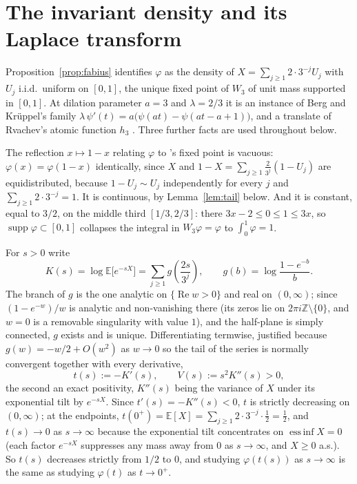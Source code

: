 \documentclass[11pt]{article}
\theoremstyle{definition}
\theoremstyle{remark}
\newcommand{\Z}{\mathbb{Z}}
\begin{document}
\section{The invariant density and its Laplace transform}
\label{sec:prelim}

Proposition~\ref{prop:fabius} identifies $\varphi$ as the density of
$X=\sum_{j\ge1}2\cdot3^{-j}U_j$ with $U_j$ i.i.d.\ uniform on $[0,1]$,
the unique fixed point of $W_3$ of unit mass supported in $[0,1]$. At
dilation parameter $a=3$ and $\lambda=2/3$ it is an instance of Berg
and Kr\"uppel's family $\lambda\,\psi'(t)=a\bigl(\psi(at)-\psi(at-a+1)\bigr)$,
and a translate of Rvachev's atomic function $h_3$ \cite{Rvachev1990}.
Three further facts are used throughout below.

The reflection $x\mapsto1-x$ relating $\varphi$ to
\cite[Cor.~7]{Wirsching2003}'s fixed point is vacuous:
$\varphi(x)=\varphi(1-x)$ identically, since $X$ and
$1-X=\sum_{j\ge1}\tfrac{2}{3^j}(1-U_j)$ are equidistributed, because
$1-U_j\sim U_j$ independently for every $j$ and
$\sum_{j\ge1}2\cdot3^{-j}=1$. It
is continuous, by Lemma~\ref{lem:tail} below. And it is constant, equal
to $3/2$, on the middle third $[1/3,2/3]$: there $3x-2\le0\le1\le3x$,
so $\operatorname{supp}\varphi\subset[0,1]$ collapses the integral in
$W_3\varphi=\varphi$ to $\int_0^1\varphi=1$.

For $s > 0$ write
\[
K(s) = \log \mathbb{E}\bigl[e^{-sX}\bigr] = \sum_{j \ge 1} g\!\left(\frac{2s}{3^j}\right), \qquad
g(b) = \log\frac{1-e^{-b}}{b}.
\]
The branch of $g$ is the one analytic on $\{\operatorname{Re} w > 0\}$ and real on $(0,\infty)$;
since $(1-e^{-w})/w$ is analytic and non-vanishing there (its zeros lie on $2\pi i \Z \setminus
\{0\}$, and $w=0$ is a removable singularity with value $1$), and the half-plane is simply
connected, $g$ exists and is unique. Differentiating termwise, justified because $g(w) = -w/2 +
O(w^2)$ as $w \to 0$ so the tail of the series is normally convergent together with every
derivative,
\[
t(s) := -K'(s), \qquad V(s) := s^2 K''(s) > 0,
\]
the second an exact positivity, $K''(s)$ being the variance of $X$ under its exponential tilt by
$e^{-sX}$. Since $t'(s) = -K''(s) < 0$, $t$ is strictly decreasing on $(0,\infty)$; at the
endpoints, $t(0^+) = \mathbb E[X] = \sum_{j\ge1} 2\cdot3^{-j}\cdot\tfrac12 = \tfrac12$, and
$t(s)\to0$ as $s\to\infty$ because the exponential tilt concentrates on $\operatorname{ess\,inf}
X=0$ (each factor $e^{-sX}$ suppresses any mass away from $0$ as $s\to\infty$, and $X\ge0$ a.s.).
So $t(s)$ decreases strictly from $1/2$ to $0$, and studying $\varphi(t(s))$ as $s \to \infty$ is
the same as studying $\varphi(t)$ as $t \to 0^+$.
\end{document}
